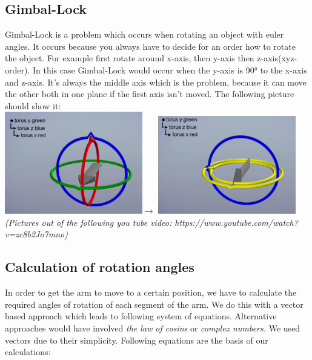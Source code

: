 \subsection{Gimbal-Lock}
Gimbal-Lock is a problem which occurs when rotating an object with euler angles. It occurs because you always have to decide for an order how to rotate the object. For example first rotate around x-axis, then y-axis then z-axis(xyz-order). In this case Gimbal-Lock would occur when the y-axis is 90° to the x-axis and z-axis. It's always the middle axis which is the problem, because it can move the other both in one plane if the first axis isn't moved. The following picture should show it:\\
\includegraphics[width=0.45\textwidth]{imgs/GimbalLock/GimbalLock1.png}$\rightarrow$
\includegraphics[width=0.45\textwidth]{imgs/GimbalLock/GimbalLock2.png}\\
\textit{(Pictures out of the following you tube video: https://www.youtube.com/watch?v=zc8b2Jo7mno)}

\subsection{Calculation of rotation angles}
In order to get the arm to move to a certain position, we have to calculate the required angles of rotation of each segment of the arm. We do this with a vector based approach which leads to following system of equations. Alternative approaches would have involved {\em the law of cosins} or {\em complex numbers.} We used vectors due to their simplicity. Following equations are the basis of our calculations:

